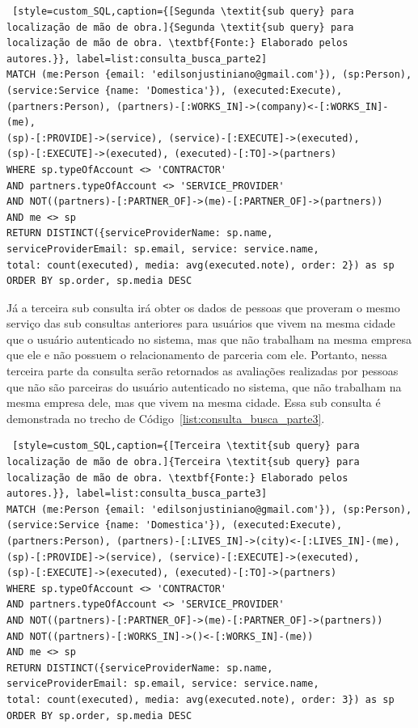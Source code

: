 \begin{lstlisting} [style=custom_SQL,caption={[Segunda \textit{sub query} para localização de mão de obra.]{Segunda \textit{sub query} para localização de mão de obra. \textbf{Fonte:} Elaborado pelos autores.}}, label=list:consulta_busca_parte2] 	
MATCH (me:Person {email: 'edilsonjustiniano@gmail.com'}), (sp:Person),
(service:Service {name: 'Domestica'}), (executed:Execute),
(partners:Person), (partners)-[:WORKS_IN]->(company)<-[:WORKS_IN]-(me),
(sp)-[:PROVIDE]->(service), (service)-[:EXECUTE]->(executed), 
(sp)-[:EXECUTE]->(executed), (executed)-[:TO]->(partners)
WHERE sp.typeOfAccount <> 'CONTRACTOR' 
AND partners.typeOfAccount <> 'SERVICE_PROVIDER'
AND NOT((partners)-[:PARTNER_OF]->(me)-[:PARTNER_OF]->(partners))
AND me <> sp
RETURN DISTINCT({serviceProviderName: sp.name, 
serviceProviderEmail: sp.email, service: service.name, 
total: count(executed), media: avg(executed.note), order: 2}) as sp 
ORDER BY sp.order, sp.media DESC
\end{lstlisting}

Já a terceira sub consulta irá obter os dados de pessoas que proveram o mesmo serviço das sub consultas anteriores para usuários que vivem na mesma cidade que o usuário autenticado no sistema, mas que não trabalham na mesma empresa que ele e não possuem o relacionamento de parceria com ele. Portanto, nessa terceira parte da consulta serão retornados as avaliações realizadas por pessoas que não são parceiras do usuário autenticado no sistema, que não trabalham na mesma empresa dele, mas que vivem na mesma cidade. Essa sub consulta é demonstrada no trecho de Código~\ref{list:consulta_busca_parte3}.

\begin{lstlisting} [style=custom_SQL,caption={[Terceira \textit{sub query} para localização de mão de obra.]{Terceira \textit{sub query} para localização de mão de obra. \textbf{Fonte:} Elaborado pelos autores.}}, label=list:consulta_busca_parte3] 	
MATCH (me:Person {email: 'edilsonjustiniano@gmail.com'}), (sp:Person),
(service:Service {name: 'Domestica'}), (executed:Execute), 
(partners:Person), (partners)-[:LIVES_IN]->(city)<-[:LIVES_IN]-(me),
(sp)-[:PROVIDE]->(service), (service)-[:EXECUTE]->(executed), 
(sp)-[:EXECUTE]->(executed), (executed)-[:TO]->(partners)
WHERE sp.typeOfAccount <> 'CONTRACTOR' 
AND partners.typeOfAccount <> 'SERVICE_PROVIDER'
AND NOT((partners)-[:PARTNER_OF]->(me)-[:PARTNER_OF]->(partners))
AND NOT((partners)-[:WORKS_IN]->()<-[:WORKS_IN]-(me))
AND me <> sp
RETURN DISTINCT({serviceProviderName: sp.name, 
serviceProviderEmail: sp.email, service: service.name, 
total: count(executed), media: avg(executed.note), order: 3}) as sp 
ORDER BY sp.order, sp.media DESC 
\end{lstlisting}

